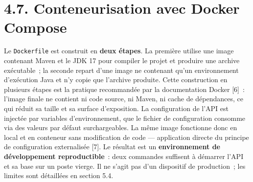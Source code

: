 \documentclass[12pt,a4paper]{report}
\begin{document}
\section*{4.7. Conteneurisation avec Docker Compose}
Le \texttt{Dockerfile} est construit en \textbf{deux étapes}. La première utilise une image contenant Maven et le JDK 17 pour compiler le projet et produire une archive exécutable~; la seconde repart d'une image ne contenant qu'un environnement d'exécution Java et n'y copie que l'archive produite. Cette construction en plusieurs étapes est la pratique recommandée par la documentation Docker [6]~: l'image finale ne contient ni code source, ni Maven, ni cache de dépendances, ce qui réduit sa taille et sa surface d'exposition.
La configuration de l'API est injectée par variables d'environnement, que le fichier de configuration consomme via des valeurs par défaut surchargeables. La même image fonctionne donc en local et en conteneur sans modification de code — application directe du principe de configuration externalisée [7]. Le résultat est un \textbf{environnement de développement reproductible}~: deux commandes suffisent à démarrer l'API et sa base sur un poste vierge. Il ne s'agit pas d'un dispositif de production~; les limites sont détaillées en section 5.4.
\end{document}
